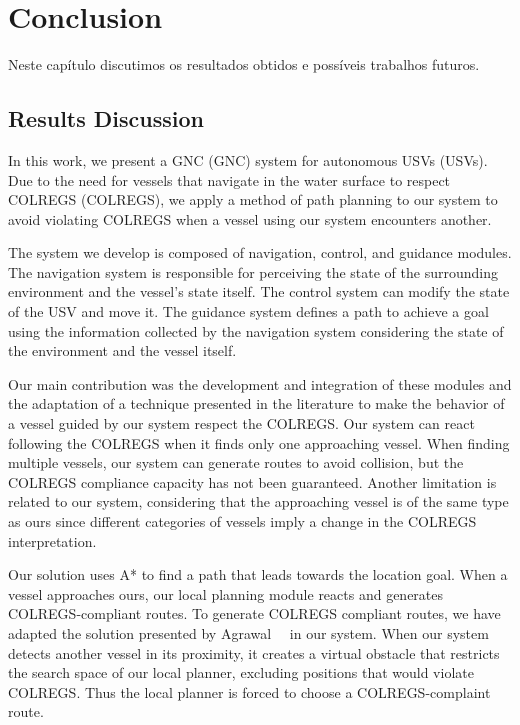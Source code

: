 \chapter{Conclusion}
\label{chap:6_Conclusion}

    Neste capítulo discutimos os resultados obtidos e possíveis trabalhos futuros.
    
    \section{Results Discussion}

    In this work, we present a \acl{GNC} (\ac{GNC}) system for autonomous \aclp{USV} (\acp{USV}). Due to the need for vessels that navigate in the water surface to respect \acl{COLREGS} (\ac{COLREGS}), we apply a method of path planning to our system to avoid violating \ac{COLREGS} when a vessel using our system encounters another.

    The system we develop is composed of navigation, control, and guidance modules. The navigation system is responsible for perceiving the state of the surrounding environment and the vessel's state itself. The control system can modify the state of the \ac{USV} and move it. The guidance system defines a path to achieve a goal using the information collected by the navigation system considering the state of the environment and the vessel itself.
    
    Our main contribution was the development and integration of these modules and the adaptation of a technique presented in the literature to make the behavior of a vessel guided by our system respect the \ac{COLREGS}. Our system can react following the \ac{COLREGS} when it finds only one approaching vessel. When finding multiple vessels, our system can generate routes to avoid collision, but the \ac{COLREGS} compliance capacity has not been guaranteed. Another limitation is related to our system, considering that the approaching vessel is of the same type as ours since different categories of vessels imply a change in the \ac{COLREGS} interpretation.
    
    Our solution uses A* to find a path that leads towards the location goal. When a vessel approaches ours, our local planning module reacts and generates \ac{COLREGS}-compliant routes. To generate \ac{COLREGS} compliant routes, we have adapted the solution presented by Agrawal~\etal~\cite{Agrawal2015COLREGS} in our system. When our system detects another vessel in its proximity, it creates a virtual obstacle that restricts the search space of our local planner, excluding positions that would violate \ac{COLREGS}. Thus the local planner is forced to choose a \ac{COLREGS}-complaint route.

